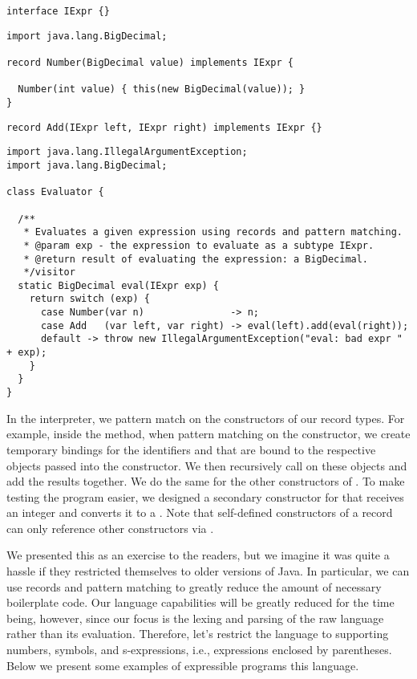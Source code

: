 \begin{lstlisting}[language=MyJava]
interface IExpr {}
\end{lstlisting}

\begin{lstlisting}[language=MyJava]
import java.lang.BigDecimal;

record Number(BigDecimal value) implements IExpr {
  
  Number(int value) { this(new BigDecimal(value)); }
}
\end{lstlisting}

\begin{lstlisting}[language=MyJava]
record Add(IExpr left, IExpr right) implements IExpr {}
\end{lstlisting}

\begin{lstlisting}[language=MyJava]
import java.lang.IllegalArgumentException;
import java.lang.BigDecimal;

class Evaluator {

  /**
   * Evaluates a given expression using records and pattern matching.
   * @param exp - the expression to evaluate as a subtype IExpr.
   * @return result of evaluating the expression: a BigDecimal.
   */visitor
  static BigDecimal eval(IExpr exp) {
    return switch (exp) {
      case Number(var n)               -> n;
      case Add   (var left, var right) -> eval(left).add(eval(right));
      default -> throw new IllegalArgumentException("eval: bad expr " + exp);
    }
  }
}
\end{lstlisting}

In the interpreter, we pattern match on the constructors of our record types. 
For example, inside the  method, when pattern matching on the  constructor, we create temporary bindings for the identifiers  and  that are bound to the respective  objects passed into the constructor. 
We then recursively call  on these objects and add the results together. 
We do the same for the other constructors of . 
To make testing the program easier, we designed a secondary constructor for  that receives an integer and converts it to a . 
Note that self-defined constructors of a record can only reference other constructors via .

We presented this as an exercise to the readers, but we imagine it was quite a hassle if they restricted themselves to older versions of Java. 
In particular, we can use records and pattern matching to greatly reduce the amount of necessary boilerplate code. 
Our language capabilities will be greatly reduced for the time being, however, since our focus is the lexing and parsing of the raw language rather than its evaluation. 
Therefore, let's restrict the language to supporting numbers, symbols, and s-expressions, i.e., expressions enclosed by parentheses. 
Below we present some examples of expressible programs this language.

